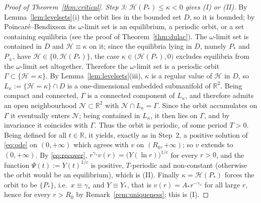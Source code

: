 \documentclass[11pt,reqno]{amsart}
\numberwithin{equation}{section}
\theoremstyle{plain}
\theoremstyle{definition}
\newcommand{\R}{\mathbb{R}}
\newcommand{\gs}{\gamma_{*}}
\begin{document}
\begin{proof}[Proof of Theorem~\ref{thm:critical}]
\smallskip
\noindent\emph{Step 3: $\mathcal H(P_{*})\le\kappa<0$ gives {\rm(I)} or
{\rm(II)}.} By Lemma~\ref{lem:levelsets}(i) the orbit lies in the bounded set
$D$, so it is bounded; by Poincar\'e--Bendixson \cite[\S1.7]{DLA} its
$\omega$-limit set is an equilibrium, a periodic orbit, or a set containing
equilibria (see the proof of Theorem~\ref{thm:dulac}). The $\omega$-limit set is
contained in $\overline D$ and $\mathcal H\equiv\kappa$ on it; since the
equilibria lying in $\overline D$, namely $P_{*}$ and $P_{\pm}$, have
$\mathcal H\in\{0,\mathcal H(P_{*})\}$, the case
$\kappa\in\big(\mathcal H(P_{*}),0\big)$ excludes equilibria from the
$\omega$-limit set altogether. Therefore the $\omega$-limit set is a periodic
orbit
$\Gamma\subset\{\mathcal H=\kappa\}$. By Lemma~\ref{lem:levelsets}(iii),
$\kappa$ is a regular value of $\mathcal H$ in $D$, so
$L_{\kappa}:=\{\mathcal H=\kappa\}\cap D$ is a one-dimensional embedded
submanifold of $\R^{2}$. Being compact and connected, $\Gamma$ is a connected
component of $L_{\kappa}$, and therefore admits an open neighbourhood
$\mathcal N\subset\R^{2}$ with $\mathcal N\cap L_{\kappa}=\Gamma$. Since the
orbit accumulates on $\Gamma$ it eventually enters $\mathcal N$; being contained
in $L_{\kappa}$, it then lies on $\Gamma$, and by invariance it coincides with
$\Gamma$. Thus the orbit is periodic, of some period $T>0$. Being defined for all
$t\in\R$, it yields, exactly as in Step~2, a positive solution of
\eqref{eq:ode} on $(0,+\infty)$ which agrees with $v$ on $(R_{0},+\infty)$; so
$v$ extends to $(0,+\infty)$. By \eqref{eq:recover},
$r^{\gs}v(r)=\big(Y(\ln r)\big)^{1/c}$ for every $r>0$, and the function
$\Psi(t):=Y(t)^{1/c}$ is positive, $T$-periodic and non-constant (otherwise the
orbit would be an equilibrium), which is {\rm(II)}.
Finally $\kappa=\mathcal H(P_{*})$ forces the orbit to be $\{P_{*}\}$, i.e.\
$x\equiv\gs$ and $Y\equiv Y_{*}$, that is $v(r)=A_{*}r^{-\gs}$ for all large
$r$, hence for every $r>R_{0}$ by Remark~\ref{rem:uniqueness}; this is
{\rm(I)}.


\end{proof}
\end{document}
